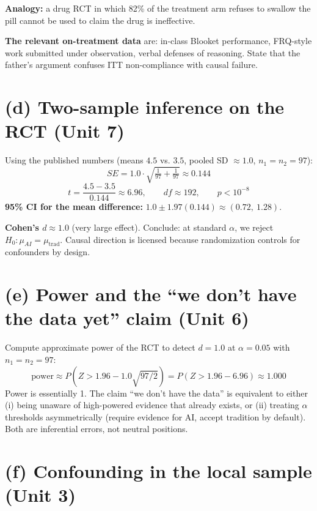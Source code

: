 \documentclass[11pt]{article}
\begin{document}
\begin{notebox}
\textbf{Analogy:} a drug RCT in which 82\% of the treatment arm
refuses to swallow the pill cannot be used to claim the drug is
ineffective.
\end{notebox}

\textbf{The relevant on-treatment data} are: in-class Blooket
performance, FRQ-style work submitted under observation, verbal
defenses of reasoning. State that the father's argument confuses
ITT non-compliance with causal failure.

\section{(d) Two-sample inference on the RCT \textnormal{\small(Unit 7)}}

Using the published numbers (means $4.5$ vs. $3.5$, pooled
SD $\approx 1.0$, $n_1 = n_2 = 97$):
\[
SE = 1.0 \cdot \sqrt{\tfrac{1}{97} + \tfrac{1}{97}} \approx 0.144
\]
\[
t = \frac{4.5 - 3.5}{0.144} \approx 6.96, \qquad
df \approx 192, \qquad p < 10^{-8}
\]
\textbf{95\% CI for the mean difference:}
$1.0 \pm 1.97(0.144) \approx (0.72,\ 1.28)$.

\textbf{Cohen's $d \approx 1.0$} (very large effect). Conclude: at
standard $\alpha$, we reject $H_0\!: \mu_{AI} = \mu_{\text{trad}}$.
Causal direction is licensed because randomization controls for
confounders by design.

\section{(e) Power and the ``we don't have the data yet'' claim \textnormal{\small(Unit 6)}}

Compute approximate power of the RCT to detect $d = 1.0$ at
$\alpha = 0.05$ with $n_1 = n_2 = 97$:
\[
\text{power} \approx P\!\left(Z > 1.96 - 1.0\sqrt{97/2}\right)
= P(Z > 1.96 - 6.96) \approx 1.000
\]
Power is essentially 1. The claim ``we don't have the data'' is
equivalent to either (i) being unaware of high-powered evidence that
already exists, or (ii) treating $\alpha$ thresholds asymmetrically
(require evidence for AI, accept tradition by default). Both are
inferential errors, not neutral positions.

\section{(f) Confounding in the local sample \textnormal{\small(Unit 3)}}
\end{document}
